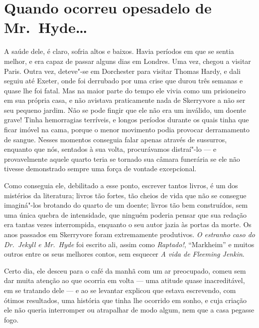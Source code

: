\chapter[Quando ocorreu o pesadelo de Mr.~Hyde\ldots{}\\ \textit{Lloyd Osbourne}]{Quando ocorreu o\break pesadelo de Mr.~Hyde\ldots{}}

A saúde dele, é claro, sofria altos e baixos.  Havia períodos em que se
sentia melhor, e era capaz de passar alguns dias em Londres.  Uma vez,
chegou a visitar Paris.  Outra vez, deteve"-se em Dorchester para
visitar Thomas Hardy, e dali seguiu até Exeter, onde foi derrubado por
uma crise que durou três semanas e quase lhe foi fatal.  Mas na maior
parte do tempo ele vivia como um prisioneiro em sua própria casa, e não
avistava praticamente nada de Skerryvore a não ser seu pequeno jardim. 
Não se pode fingir que ele não era um inválido, um doente grave!  Tinha
hemorragias terríveis, e longos períodos durante os quais tinha que
ficar imóvel na cama, porque o menor movimento podia provocar		
derramamento de sangue.  Nesses momentos conseguia falar apenas
através de sussurros, enquanto que nós, sentados à sua volta,
procurávamos distraí"-lo --- e provavelmente aquele quarto teria se
tornado sua câmara funerária se ele não tivesse demonstrado sempre uma
força de vontade excepcional.

Como conseguia ele, debilitado a esse ponto, escrever tantos livros, é
um dos mistérios da literatura; livros tão fortes, tão cheios de vida
que não se consegue imaginá"-los brotando do quarto de um doente; livros
tão bem construídos, sem uma única quebra de intensidade, que ninguém
poderia pensar que sua redação era tantas vezes interrompida, enquanto
o seu autor jazia às portas da morte.  Os anos passados em Skerryvore
foram extremamente produtivos.  \textit{O estranho caso do Dr.~Jekyll e
Mr.~Hyde} foi escrito ali, assim como \textit{Raptado!}, “Markheim” e
muitos outros entre os seus melhores contos, sem esquecer \textit{A
vida de Fleeming Jenkin}. 

Certo dia, ele desceu para o café da manhã com um ar preocupado, comeu
sem dar muita atenção ao que ocorria em volta --- uma atitude quase
inacreditável, em se tratando dele --- e ao se levantar explicou que
estava escrevendo, com ótimos resultados, uma história que tinha lhe
ocorrido em sonho, e cuja criação ele não queria interromper ou
atrapalhar de modo algum, nem que a casa pegasse fogo.

